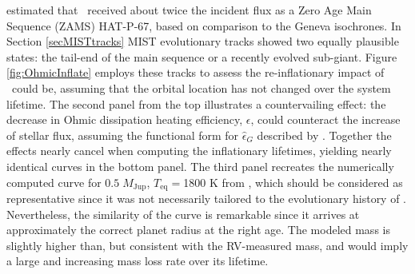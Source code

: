 \documentclass[twocolumn]{aastex631}
\newcommand{\hatpb}{\object{HAT-P-67 b}}
\begin{document}
\citet{2017AJ....153..211Z} estimated that \hatpb~received about twice the incident flux as a Zero Age Main Sequence (ZAMS) HAT-P-67, based on comparison to the Geneva isochrones. In Section \ref{secMISTtracks} MIST evolutionary tracks showed two equally plausible states: the tail-end of the main sequence or a recently evolved sub-giant.  Figure \ref{fig:OhmicInflate} employs these tracks to assess the re-inflationary impact of \hatpb~could be, assuming that the orbital location has not changed over the system lifetime.  The second panel from the top illustrates a countervailing effect: the decrease in Ohmic dissipation heating efficiency, $\epsilon$, could counteract the increase of stellar flux, assuming the functional form for $\hat{\epsilon}_G$ described by \citet{2018AJ....155..214T}.  Together the effects nearly cancel when computing the inflationary lifetimes, yielding nearly identical curves in the bottom panel.  The third panel recreates the numerically computed curve for $0.5\;M_\mathrm{Jup}$, $T_\mathrm{eq}=$1800 K from \citep{2011ApJ...738....1B}, which should be considered as representative since it was not necessarily tailored to the evolutionary history of \hatpb.  Nevertheless, the similarity of the curve is remarkable since it arrives at approximately the correct planet radius at the right age.  The modeled mass is slightly higher than, but consistent with the RV-measured mass, and would imply a large and increasing mass loss rate over its lifetime.
\end{document}
